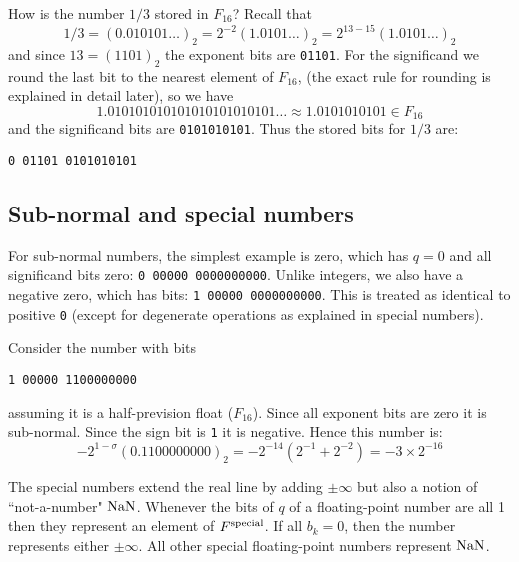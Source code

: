 \begin{example} How is the number $1/3$ stored in $F_{16}$? Recall that
\[
1/3 = (0.010101\ensuremath{\ldots})_2 = 2^{-2} (1.0101\ensuremath{\ldots})_2 = 2^{13-15} (1.0101\ensuremath{\ldots})_2
\]
and since $13 = (1101)_2$  the exponent bits are \texttt{01101}. For the significand we round the last bit to the nearest element of $F_{16}$,  (the exact rule for rounding is explained in detail later), so we have
\[
1.010101010101010101010101\ensuremath{\ldots}\approx 1.0101010101 \in F_{16} 
\]
and the significand bits are \texttt{0101010101}. Thus the stored bits for $1/3$ are:

\begin{verbatim}
0 01101 0101010101
\end{verbatim}
\end{example}

\subsection{Sub-normal and special numbers}
For sub-normal numbers, the simplest example is zero, which has $q=0$ and all significand bits zero: \texttt{0 00000 0000000000}. Unlike integers, we also have a negative zero, which has bits: \texttt{1 00000 0000000000}. This is treated as identical to positive \texttt{0} (except for degenerate operations as explained in special numbers).

\begin{example} Consider the number with bits

\begin{verbatim}
1 00000 1100000000
\end{verbatim}
assuming it is a half-prevision float ($F_{16}$).  Since all exponent bits are zero it is sub-normal. Since the sign bit is \texttt{1} it is negative.  Hence this number is:
\[
-2^{1-\ensuremath{\sigma}} (0.1100000000)_2 = -2^{-14} (2^{-1} + 2^{-2}) = -3 \ensuremath{\times} 2^{-16}
\]
\end{example}

The special numbers extend the real line by adding $\ensuremath{\pm}\ensuremath{\infty}$ but also a notion of ``not-a-number" ${\rm NaN}$. Whenever the bits of $q$ of a floating-point number are all 1 then they represent an element of $F^{\rm special}$. If all $b_k=0$, then the number represents either $\ensuremath{\pm}\ensuremath{\infty}$. All other special floating-point numbers represent ${\rm NaN}$. 

